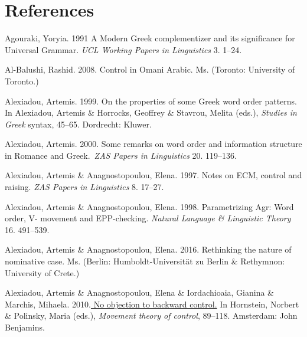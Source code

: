 \documentclass[output=paper]{langsci/langscibook}
\begin{document}
\section{ References}

\begin{styleNurTexti}
Agouraki, Yoryia. 1991 A Modern Greek complementizer and its significance for Universal Grammar. \textit{UCL Working Papers in Linguistics} 3. 1–24.
\end{styleNurTexti}

\begin{styleNormalWeb}
Al-Balushi, Rashid. 2008. Control in Omani Arabic. Ms. (Toronto: University of Toronto.)
\end{styleNormalWeb}

Alexiadou, Artemis. 1999. On the properties of some Greek word order patterns. In Alexiadou, Artemis \& Horrocks, Geoffrey \& Stavrou, Melita (eds.), \textit{Studies in Greek} syntax, 45–65. Dordrecht: Kluwer.

Alexiadou, Artemis. 2000. Some remarks on word order and information structure in Romance and Greek.~\textit{ZAS Papers in Linguistics} 20. 119–136.

\begin{styleNormalWeb}
Alexiadou, Artemis \& Anagnostopoulou, Elena. 1997. Notes on ECM, control and raising. \textit{ZAS Papers in Linguistics} 8. 17–27.
\end{styleNormalWeb}

\begin{styleNurTexti}
Alexiadou, Artemis \& Anagnostopoulou, Elena. 1998. Parametrizing Agr: Word order, V- movement and EPP-checking. \textit{Natural Language \& Linguistic Theory} 16. 491–539.
\end{styleNurTexti}

\begin{styleNormalWeb}
Alexiadou, Artemis \& Anagnostopoulou, Elena. 2016. Rethinking the nature of nominative case. Ms. (Berlin: Humboldt-Universität zu Berlin \& Rethymnon: University of Crete.)
\end{styleNormalWeb}

\begin{styleNormalWeb}
Alexiadou, Artemis \& Anagnostopoulou, Elena \& Iordachioaia, Gianina \& Marchis, Mihaela. 2010.\href{http://ifla.uni-stuttgart.de/files/BC paper.pdf}{ No objection to backward control.} In Hornstein, Norbert \& Polinsky, Maria (eds.), \textit{Movement theory of control}, 89–118. Amsterdam: John Benjamins.
\end{styleNormalWeb}
\end{document}
